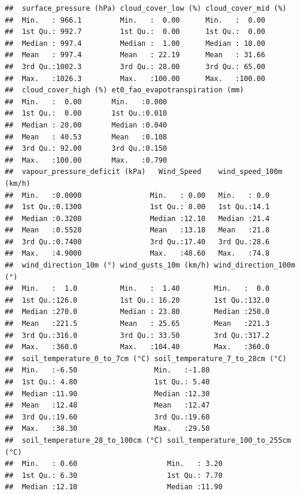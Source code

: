 \documentclass[
]{article}
\begin{document}
\begin{verbatim}
##  surface_pressure (hPa) cloud_cover_low (%) cloud_cover_mid (%)
##  Min.   : 966.1         Min.   :  0.00      Min.   :  0.00     
##  1st Qu.: 992.7         1st Qu.:  0.00      1st Qu.:  0.00     
##  Median : 997.4         Median :  1.00      Median : 10.00     
##  Mean   : 997.4         Mean   : 22.19      Mean   : 31.66     
##  3rd Qu.:1002.3         3rd Qu.: 28.00      3rd Qu.: 65.00     
##  Max.   :1026.3         Max.   :100.00      Max.   :100.00     
##  cloud_cover_high (%) et0_fao_evapotranspiration (mm)
##  Min.   :  0.00       Min.   :0.000                  
##  1st Qu.:  0.00       1st Qu.:0.010                  
##  Median : 20.00       Median :0.040                  
##  Mean   : 40.53       Mean   :0.108                  
##  3rd Qu.: 92.00       3rd Qu.:0.150                  
##  Max.   :100.00       Max.   :0.790                  
##  vapour_pressure_deficit (kPa)   Wind_Speed    wind_speed_100m (km/h)
##  Min.   :0.0000                Min.   : 0.00   Min.   : 0.0          
##  1st Qu.:0.1300                1st Qu.: 8.00   1st Qu.:14.1          
##  Median :0.3200                Median :12.10   Median :21.4          
##  Mean   :0.5528                Mean   :13.18   Mean   :21.8          
##  3rd Qu.:0.7400                3rd Qu.:17.40   3rd Qu.:28.6          
##  Max.   :4.9000                Max.   :48.60   Max.   :74.8          
##  wind_direction_10m (°) wind_gusts_10m (km/h) wind_direction_100m (°)
##  Min.   :  1.0          Min.   :  1.40        Min.   :  0.0          
##  1st Qu.:126.0          1st Qu.: 16.20        1st Qu.:132.0          
##  Median :270.0          Median : 23.80        Median :250.0          
##  Mean   :221.5          Mean   : 25.65        Mean   :221.3          
##  3rd Qu.:316.0          3rd Qu.: 33.50        3rd Qu.:317.2          
##  Max.   :360.0          Max.   :104.40        Max.   :360.0          
##  soil_temperature_0_to_7cm (°C) soil_temperature_7_to_28cm (°C)
##  Min.   :-6.50                  Min.   :-1.80                  
##  1st Qu.: 4.80                  1st Qu.: 5.40                  
##  Median :11.90                  Median :12.30                  
##  Mean   :12.48                  Mean   :12.47                  
##  3rd Qu.:19.60                  3rd Qu.:19.60                  
##  Max.   :38.30                  Max.   :29.50                  
##  soil_temperature_28_to_100cm (°C) soil_temperature_100_to_255cm (°C)
##  Min.   : 0.60                     Min.   : 3.20                     
##  1st Qu.: 6.30                     1st Qu.: 7.70                     
##  Median :12.10                     Median :11.90                     

\end{verbatim}
\end{document}
